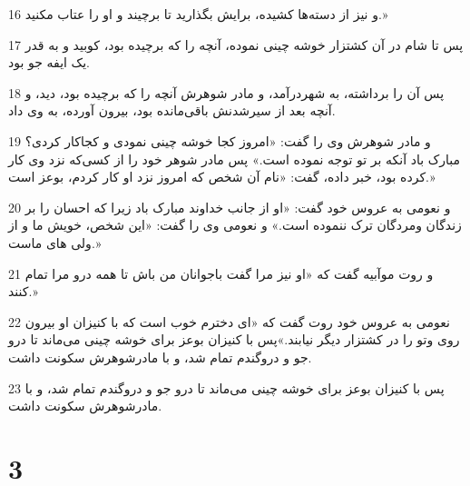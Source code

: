 \par 16 و نیز از دسته‌ها کشیده، برایش بگذارید تا برچیند و او را عتاب مکنید.»
\par 17 پس تا شام در آن کشتزار خوشه چینی نموده، آنچه را که برچیده بود، کوبید و به قدر یک ایفه جو بود.
\par 18 پس آن را برداشته، به شهردرآمد، و مادر شوهرش آنچه را که برچیده بود، دید، و آنچه بعد از سیرشدنش باقی‌مانده بود، بیرون آورده، به وی داد.
\par 19 و مادر شوهرش وی را گفت: «امروز کجا خوشه چینی نمودی و کجاکار کردی؟ مبارک باد آنکه بر تو توجه نموده است.» پس مادر شوهر خود را از کسی‌که نزد وی کار کرده بود، خبر داده، گفت: «نام آن شخص که امروز نزد او کار کردم، بوعز است.»
\par 20 و نعومی به عروس خود گفت: «او از جانب خداوند مبارک باد زیرا که احسان را بر زندگان ومردگان ترک ننموده است.» و نعومی وی را گفت: «این شخص، خویش ما و از ولی های ماست.»
\par 21 و روت موآبیه گفت که «او نیز مرا گفت باجوانان من باش تا همه درو مرا تمام کنند.»
\par 22 نعومی به عروس خود روت گفت که «ای دخترم خوب است که با کنیزان او بیرون روی وتو را در کشتزار دیگر نیابند.»پس با کنیزان بوعز برای خوشه چینی می‌ماند تا درو جو و دروگندم تمام شد، و با مادرشوهرش سکونت داشت.
\par 23 پس با کنیزان بوعز برای خوشه چینی می‌ماند تا درو جو و دروگندم تمام شد، و با مادرشوهرش سکونت داشت.
 
\chapter{3}

